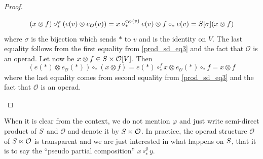 \documentclass[11pt]{article}
\theoremstyle{definition}
\numberwithin{equation}{section}
\newcommand{\spe}[1]{\normalfont{\textsc{#1}}}
\newcommand{\comp}[1][\ast]{\circ_{#1}}
\newcommand{\Operad}{\mathcal{O}}
\begin{document}
\begin{proof}
\begin{itemize}
        \begin{equation}
            (x\otimes f)\comp^{\varphi} (e(v)\otimes e_{\Operad}(v))= x\comp^{e_{\Operad}(v)}e(v) \otimes f\comp e(v) = \spe{S}[\sigma](x\otimes f)
        \end{equation}
        where $\sigma$ is the bijection which sends $\ast$ to $v$ and is the identity on $V$. The last 
        equality follows from the first equality from \eqref{prod_sd_eq3} and the fact that $\Operad$ is an 
        operad. Let now be $x\otimes f\in\spe{S}\times\Operad[V]$. Then
        \begin{equation}
            (e(\ast)\otimes e_{\Operad}(\ast))\comp (x\otimes f) = e(\ast)\comp^f x \otimes e_{\Operad}(\ast)\comp f = x\otimes f
        \end{equation}
        where the last equality comes from second equality from \eqref{prod_sd_eq3} and the fact that 
        $\Operad$ is an operad. \qedhere
    \end{itemize}
\end{proof}

When it is clear from the context, we do not mention $\varphi$ and just write semi-direct product of 
$\spe{S}$ and $\Operad$ and denote it by $\spe{S}\ltimes \Operad$. In practice, the operad structure 
$\Operad$ of $\spe{S}\ltimes\Operad$ is transparent and we are just interested in what happens on 
$\spe{S}$, that it is to say the ``pseudo partial composition'' $x\comp^g y$.
\end{document}
